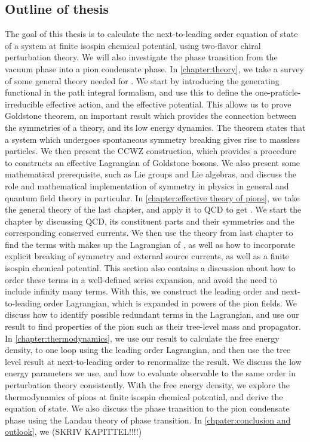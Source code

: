 \subsection*{Outline of thesis}
The goal of this thesis is to calculate the next-to-leading order equation of state of a system at finite isospin chemical potential, using two-flavor chiral perturbation theory.
We will also investigate the phase transition from the vacuum phase into a pion condensate phase.
In \cref{chapter:theory}, we take a survey of some general theory needed for \chpt.
We start by introducing the generating functional in the path integral formalism, and use this to define the one-praticle-irreducible effective action, and the effective potential.
This allows us to prove Goldstone theorem, an important result which provides the connection between the symmetries of a theory, and its low energy dynamics.
The theorem states that a system which undergoes spontaneous symmetry breaking gives rise to massless particles.
We then present the CCWZ construction, which provides a procedure to constructs an effective Lagrangian of Goldstone bosons.
We also present some mathematical prerequisite, such as Lie groups and Lie algebras, and discuss the role and mathematical implementation of symmetry in physics in general and quantum field theory in particular.
In \autoref{chapter:effective theory of pions}, we take the general theory of the last chapter, and apply it to QCD to get \chpt.
We start the chapter by discussing QCD, its constituent parts and their symmetries and the corresponding conserved currents.
We then use the theory from last chapter to find the terms with makes up the Lagrangian of \chpt, as well as how to incorporate explicit breaking of symmetry and external source currents, as well as a finite isospin chemical potential.
This section also contains a discussion about how to order these terms in a well-defined series expansion, and avoid the need to include infinity many terms.
With this, we construct the leading order and next-to-leading order Lagrangian, which is expanded in powers of the pion fields.
We discuss how to identify possible redundant terms in the Lagrangian, and use our result to find properties of the pion such as their tree-level mass and propagator.
In \autoref{chapter:thermodynamics}, we use our result to calculate the free energy density, to one loop using the leading order Lagrangian, and then use the tree level result at next-to-leading order to renormalize the result.
We discuss the low energy parameters we use, and how to evaluate observable to the same order in perturbation theory consistently.
With the free energy density, we explore the thermodynamics of pions at finite isospin chemical potential, and derive the equation of state.
We also discuss the phase transition to the pion condensate phase using the Landau theory of phase transition.
In \autoref{chpater:conclusion and outlook}, we (SKRIV KAPITTEL!!!!)

